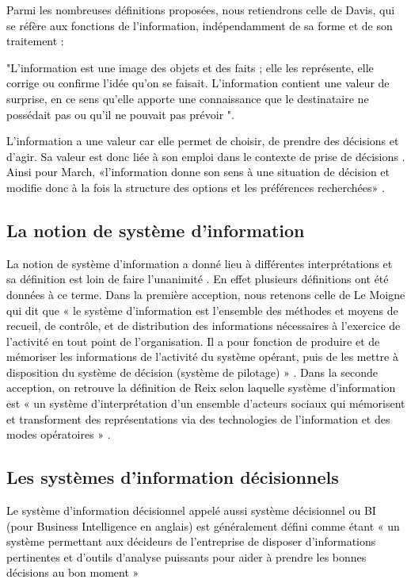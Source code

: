 \documentclass[a4paper,12pt]{report}
\begin{document}
\textcolor{black}{Parmi les nombreuses définitions proposées,  nous retiendrons celle de  Davis,  qui se réfère aux fonctions de l'information, indépendamment de sa forme et de son traitement :}

\textcolor{black}{
		"L’information est une image des objets et des faits ; elle les représente, elle corrige ou confirme l'idée qu'on se faisait. L'information contient une valeur de surprise, en ce sens qu'elle apporte une connaissance que le destinataire ne possédait pas ou qu'il ne pouvait pas prévoir "\citep{davis1986systemes}.
}
	
\textcolor{black}{L'information a une valeur car elle permet  de choisir, de prendre des décisions et d'agir. Sa valeur est donc liée à son emploi dans le contexte de prise de décisions \citep{haouet2008informatique} . 
Ainsi pour March,  «l'information donne son sens à une situation de décision et modifie donc à la fois la structure des options et les préférences recherchées» \citep{march1991systemes}.}

\subsection{La notion de système d’information}
\textcolor{black}{La notion de système d'information a donné lieu à différentes interprétations et sa définition est loin de faire l'unanimité \citep{haouet2008informatique}. En effet plusieurs définitions ont été données à ce terme. Dans la première acception, nous retenons celle de Le Moigne qui dit que «  le système d’information est l’ensemble des méthodes et moyens de recueil, de contrôle, et de distribution des informations nécessaires à l’exercice de l’activité en tout point de l’organisation. Il a pour fonction de produire et de mémoriser les informations de l’activité   du système opérant, puis de les mettre à disposition du système de décision (système de pilotage) »  \citep{le1977thorie}. Dans la seconde acception, on retrouve la définition de Reix selon laquelle système d’information est  « un  système  d’interprétation d’un ensemble d’acteurs sociaux qui mémorisent et transforment des représentations via des technologies de l’information et des modes opératoires » \citep{reix2002recherche}.}
\subsection{Les systèmes d’information décisionnels}
\textcolor{black}{Le système d’information décisionnel appelé aussi système décisionnel ou BI (pour Business Intelligence en anglais) est généralement défini comme étant « un système permettant aux décideurs de l’entreprise de disposer d’informations pertinentes et d’outils d’analyse puissants pour aider à prendre les bonnes décisions au bon moment » \citep{devisy02livre}}
\end{document}
